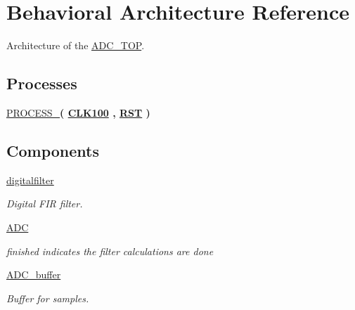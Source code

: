 \hypertarget{classADC__TOP_1_1Behavioral}{\section{Behavioral Architecture Reference}
\label{classADC__TOP_1_1Behavioral}
}


Architecture of the \hyperlink{classADC__TOP}{A\-D\-C\-\_\-\-T\-O\-P}.  


\subsection*{Processes}
 \begin{DoxyCompactItemize}
\item 
\hypertarget{classADC__TOP_1_1Behavioral_af7530dff761625dab17b84e8c5926692}{\hyperlink{classADC__TOP_1_1Behavioral_af7530dff761625dab17b84e8c5926692}{P\-R\-O\-C\-E\-S\-S\-\_}{\bfseries  ( {\bfseries {\bfseries \hyperlink{classADC__TOP_ab1f7becce7cb29d94bb2f2ec187f72a4}{C\-L\-K100}} \textcolor{vhdlchar}{ }\textcolor{vhdlchar}{ }\textcolor{vhdlchar}{ }} , {\bfseries {\bfseries \hyperlink{classADC__TOP_a91cf794d165cc0a740042335a6062940}{R\-S\-T}} \textcolor{vhdlchar}{ }} )}}\label{classADC__TOP_1_1Behavioral_af7530dff761625dab17b84e8c5926692}

\end{DoxyCompactItemize}
\subsection*{Components}
 \begin{DoxyCompactItemize}
\item 
\hypertarget{classADC__TOP_1_1Behavioral_ae43da35f6da7738b69d6245cc2ca3b49}{\hyperlink{classADC__TOP_1_1Behavioral_ae43da35f6da7738b69d6245cc2ca3b49}{digitalfilter}  {\bfseries }  }\label{classADC__TOP_1_1Behavioral_ae43da35f6da7738b69d6245cc2ca3b49}

\begin{DoxyCompactList}\small\item\em Digital F\-I\-R filter. \end{DoxyCompactList}\item 
\hypertarget{classADC__TOP_1_1Behavioral_ad251174263b28388454816799ffd91ae}{\hyperlink{classADC__TOP_1_1Behavioral_ad251174263b28388454816799ffd91ae}{A\-D\-C}  {\bfseries }  }\label{classADC__TOP_1_1Behavioral_ad251174263b28388454816799ffd91ae}

\begin{DoxyCompactList}\small\item\em finished indicates the filter calculations are done \end{DoxyCompactList}\item 
\hypertarget{classADC__TOP_1_1Behavioral_a76d32257e982d92a96905d3f9b3babc8}{\hyperlink{classADC__TOP_1_1Behavioral_a76d32257e982d92a96905d3f9b3babc8}{A\-D\-C\-\_\-buffer}  {\bfseries }  }\label{classADC__TOP_1_1Behavioral_a76d32257e982d92a96905d3f9b3babc8}

\begin{DoxyCompactList}\small\item\em Buffer for samples. \end{DoxyCompactList}\end{DoxyCompactItemize}
